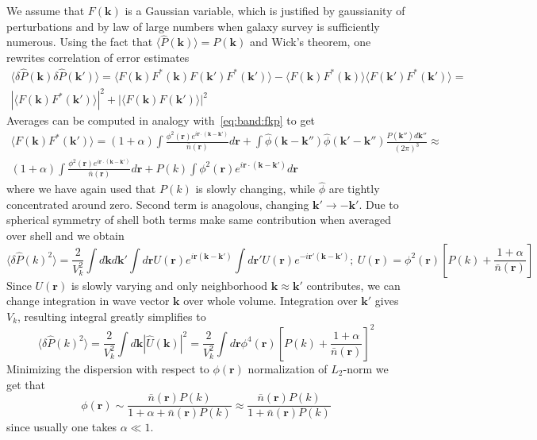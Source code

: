 \documentclass[12pt]{extarticle}
\numberwithin{problem}{section}
\numberwithin{theorem}{section}
\begin{document}
	We assume that $F(\mathbf{k})$ is a Gaussian variable, which is justified by gaussianity of perturbations and by law of large numbers when galaxy survey is sufficiently numerous. Using the fact that $\langle\hat{P}(\mathbf{k})\rangle = P(\mathbf{k})$ and Wick's theorem, one rewrites correlation of error estimates
	\begin{multline}
		\langle\delta \hat{P}(\mathbf{k})\delta \hat{P}(\mathbf{k}')\rangle = \langle F(\mathbf{k})F^*(\mathbf{k})F(\mathbf{k}')F^*(\mathbf{k}')\rangle - \langle F(\mathbf{k})F^*(\mathbf{k})\rangle\langle F(\mathbf{k}')F^*(\mathbf{k}')\rangle =\\
		|\langle F(\mathbf{k})F^*(\mathbf{k}')\rangle|^2 + |\langle F(\mathbf{k})F(\mathbf{k}')\rangle|^2
	\end{multline}
	Averages can be computed in analogy with~\ref{eq:band:fkp} to get
	\begin{multline}
		\langle F(\mathbf{k})F^*(\mathbf{k}')\rangle = (1 + \alpha)\int \frac{\phi^2(\mathbf{r})e^{i\mathbf{r}\cdot(\mathbf{k} - \mathbf{k}')}}{\bar{n}(\mathbf{r})} d\mathbf{r} + \int \hat{\phi}(\mathbf{k} - \mathbf{k}'')\hat{\phi}(\mathbf{k}' - \mathbf{k}'')\frac{P(\mathbf{k}'')d\mathbf{k}''}{(2\pi)^3}\approx\\
		(1 + \alpha)\int \frac{\phi^2(\mathbf{r})e^{i\mathbf{r}\cdot(\mathbf{k} - \mathbf{k}')}}{\bar{n}(\mathbf{r})} d\mathbf{r} + P(k)\int \phi^2(\mathbf{r})e^{i\mathbf{r}\cdot(\mathbf{k} - \mathbf{k}')} d\mathbf{r}
	\end{multline}
	where we have again used that $P(k)$ is slowly changing, while $\hat{\phi}$ are tightly concentrated around zero. Second term is anagolous, changing $\mathbf{k}'\to -\mathbf{k}'$. Due to spherical symmetry of shell both terms make same contribution when averaged over shell and we obtain
	\begin{equation}
		\langle\delta\hat{P}(k)^2\rangle = \frac{2}{V_k^2}\int d\mathbf{k}d\mathbf{k'}\int d\mathbf{r} U(\mathbf{r})e^{i\mathbf{r}(\mathbf{k} - \mathbf{k}')}\int d\mathbf{r'}U(\mathbf{r})e^{-i\mathbf{r}'(\mathbf{k} - \mathbf{k}')};\ U(\mathbf{r}) = \phi^2(\mathbf{r})\left[P(k) + \frac{1 + \alpha}{\bar{n}(\mathbf{r})}\right]
	\end{equation}
	Since $U(\mathbf{r})$ is slowly varying and only neighborhood $\mathbf{k}\approx\mathbf{k}'$ contributes, we can change integration in wave vector $\mathbf{k}$ over whole volume. Integration over $\mathbf{k}'$ gives $V_k$, resulting integral greatly simplifies to 
	\begin{equation}
		\langle\delta\hat{P}(k)^2\rangle = \frac{2}{V_k^2}\int d\mathbf{k} |\hat{U}(\mathbf{k})|^2 = \frac{2}{V_k^2}\int d\mathbf{r} \phi^4(\mathbf{r})\left[P(k) + \frac{1 + \alpha}{\bar{n}(\mathbf{r})}\right]^2
	\end{equation}
	Minimizing the dispersion with respect to $\phi(\mathbf{r})$ normalization of $L_2$-norm we get that
	\begin{equation}
		\phi(\mathbf{r})\sim\frac{\bar{n}(\mathbf{r})P(k)}{1 + \alpha + \bar{n}(\mathbf{r})P(k)}\approx \frac{\bar{n}(\mathbf{r})P(k)}{1 + \bar{n}(\mathbf{r})P(k)}
	\end{equation}
	since usually one takes $\alpha\ll 1$.
	
	
	
\end{document}
